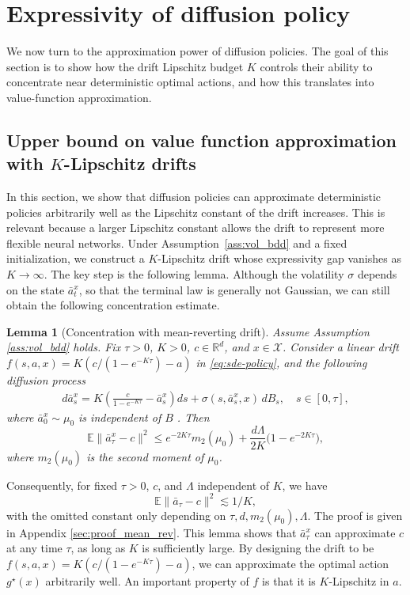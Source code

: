 \documentclass{article}
\newtheorem{lem}[thm]{Lemma}
\newcommand{\1}{\mathbbm{1}}
\newcommand{\renyuan}[1]{\textcolor{cyan}{[\textbf{renyuan}:#1]}}
\numberwithin{equation}{section}
\begin{document}
\section{Expressivity of diffusion policy}\label{sec:expressivity}
We now turn to the approximation power of diffusion policies. 
The goal of this section is to show how the drift Lipschitz budget \(K\) controls their ability to concentrate near deterministic optimal actions, and how this translates into value-function approximation. 

\subsection{Upper bound on value function approximation with $K$-Lipschitz drifts}
In this section, we show that diffusion policies can approximate deterministic policies arbitrarily well as the Lipschitz constant of the drift increases. This is relevant because a larger Lipschitz constant allows the drift to represent more flexible neural networks. Under Assumption~\ref{ass:vol_bdd} and a fixed initialization, we construct a $K$-Lipschitz drift whose expressivity gap vanishes as $K\rightarrow\infty$. The key step is the following lemma. Although the volatility $\sigma$ depends on the state 
$\bar a_t^x$, so that the terminal law is generally not Gaussian, we can still obtain the following concentration estimate.
\begin{lem}[Concentration with mean-reverting drift]\label{lem:mean-reversion-concentration}
\label{lem:mean_rev} Assume Assumption \ref{ass:vol_bdd} holds.
Fix \(\tau>0\), \(K>0\), \(c\in\mathbb R^d\), and \(x\in\mathcal X\). Consider a linear drift $ f(s, a,x) = K(c/(1-e^{-K\tau})- a)$ in \eqref{eq:sde-policy}, and the following diffusion process
\begin{align}\label{eq:simpleOU}
    d\bar a^x_s
    =
    K\left(\frac{c}{1-e^{-K\tau}}-\bar a_s^x\right)ds
    +
    \sigma(s,\bar a^x_s,x)\,dB_s, \quad s\in[0,\tau],
\end{align}
where \(\bar a^x_0\sim \mu_{0}\) is independent of \(B\) .
Then
\[
    \mathbb E\|\bar a^x_\tau-c\|^2
    \le e^{-2K\tau}m_{2}(\mu_{0})
    +
    \dfrac{d\Lambda}{2K}
    \bigl(1-e^{-2K\tau}\bigr),
\]
where $m_2(\mu_0)$ is the second moment of $\mu_0$. 
\end{lem}
Consequently, for fixed \(\tau>0\), \(c\), and \(\Lambda\) independent of \(K\), we have 
$$\mathbb E\|\bar a_\tau-c\|^2
    \lesssim 1/K,$$
 with the omitted constant only depending on $\tau, d, m_{2}(\mu_{0}), \Lambda$. The proof is given in Appendix \ref{sec:proof_mean_rev}. This lemma shows that $\bar{a}^x_{\tau}$ can approximate $c$ at any time $\tau$, as long as $K$ is sufficiently large. By designing the drift to be $f(s,a,x) = K(c/(1-e^{-K\tau})-a)$,  we can approximate the optimal action $g^\star(x)$  arbitrarily well. An important property of $f$ is that it is $K$-Lipschitz in $a$.
\end{document}
